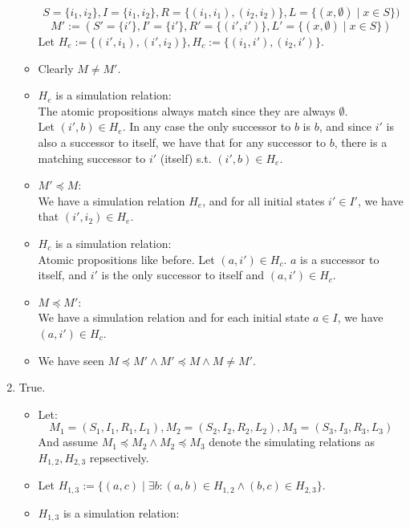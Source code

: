 \documentclass{article}
\begin{document}
\begin{enumerate}[label=\alph*.]
\begin{itemize}
\[                S=\{i_1,i_2\},
                I=\{i_1,i_2\},
                R=\{(i_1,i_1), (i_2,i_2)\},
                L=\{(x,\emptyset)\mid x\in S\}
            )
        \]
        \[
            M':=(
                S'=\{i'\},
                I'=\{i'\},
                R'=\{(i',i')\},
                L'=\{(x,\emptyset)\mid x\in S\}
            )
        \]
        Let $H_e:=\{(i',i_1), (i',i_2)\}, H_c:=\{(i_1,i'), (i_2,i')\}$.
        \item Clearly $M\neq M'$.
        \item $H_e$ is a simulation relation:\\
        The atomic propositions always match since they are always $\emptyset$.\\
        Let $(i',b)\in H_e$. In any case the only successor to $b$ is $b$,
        and since $i'$ is also a successor to itself, we have that for any successor to $b$,
        there is a matching successor to $i'$ (itself) s.t. $(i',b)\in H_e$.\\
        \item $M'\preceq M$:\\
        We have a simulation relation $H_e$,
        and for all initial states $i'\in I'$, we have that $(i',i_2)\in H_e$.
        \item $H_c$ is a simulation relation:\\
        Atomic propositions like before.
        Let $(a,i')\in H_c$. $a$ is a successor to itself,
        and $i'$ is the only successor to itself and $(a,i')\in H_c$.
        \item $M\preceq M'$:\\
        We have a simulation relation and for each initial state $a\in I$,
        we have $(a,i')\in H_c$.
        \item We have seen $M\preceq M'\wedge M'\preceq M\wedge M\neq M'$.
    \end{itemize}
    \item True.
    \begin{itemize}
        \item 
        Let:
        $$
            M_1=(S_1,I_1,R_1,L_1),
            M_2=(S_2,I_2,R_2,L_2),
            M_3=(S_3,I_3,R_3,L_3)
        $$
        And assume $M_1\preceq M_2\wedge M_2\preceq M_3$ denote the simulating
        relations as $H_{1,2}, H_{2,3}$ repsectively.
        \item Let $H_{1,3}:=\{(a,c)\mid \exists b: (a,b)\in H_{1,2}\wedge (b,c)\in H_{2,3}\}$.
        \item $H_{1,3}$ is a simulation relation:\\

\end{itemize}
\end{enumerate}
\end{document}
